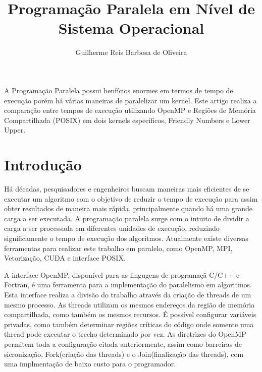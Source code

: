 \documentclass[12pt]{article}
\title{Programação Paralela em Nível de Sistema Operacional}
\author{Guilherme Reis Barbosa de Oliveira\inst{1}}
\begin{document}
 

\maketitle

\begin{abstract}
  
\end{abstract}
     
\begin{resumo} 
  A Programação Paralela possui benfícios enormes em termos de tempo de execução porém há várias maneiras de 
  paralelizar um kernel. Este artigo realiza a comparação entre tempos de execução utilizando OpenMP e Regiões de Memória
  Compartilhada (POSIX) em dois kernels específicos, Friendly Numbers e Lower Upper. 
\end{resumo}


\section{Introdução}

Há décadas, pesquisadores e engenheiros buscam maneiras mais eficientes de se executar um algoritmo com o objetivo de reduzir o tempo de execução para assim obter resultados de maneira mais rápida, principalmente quando há uma grande carga a ser executada. A programação paralela surge com o intuito de dividir a carga a ser processada em diferentes unidades de execução, reduzindo significamente o tempo de execução dos algoritmos. Atualmente existe diversas ferramentas para realizar este trabalho em paralelo, como OpenMP, MPI, Vetorização, CUDA e interface POSIX.

A interface OpenMP, disponível para as lingugens de programaçã C/C++ e Fortran, é uma ferramenta para a implementação do paralelismo em algoritmos. Esta interface realiza a divisão do trabalho através da criação de threads de um mesmo processo. As threads utilizam os mesmos endereços da região de memória compartilhada, como também os mesmos recursos. É possível configurar variáveis privadas, como também determinar regiões críticas do código onde somente uma thread pode executar o trecho determinado por vez. As diretrizes do OpenMP permitem toda a configuração citada anteriormente, assim como barreiras de sicronização, Fork(criação das threads) e o Join(finalização das threads), com uma implmentação de baixo custo para o programador.
\end{document}
